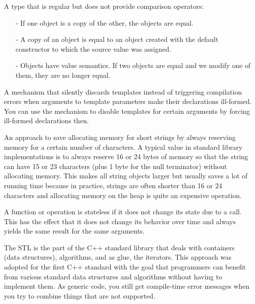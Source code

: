 



A type that is regular but does not provide comparison operators:

\begin{itemize}
\item [-]
If one object is a copy of the other, the objects are equal.

\item [-]
A copy of an object is equal to an object created with the default constructor to which the source value was assigned.

\item [-]
Objects have value semantics. If two objects are equal and we modify one of them, they are no longer equal.
\end{itemize}


A mechanism that silently discards templates instead of triggering compilation errors when arguments to template parameters make their declarations ill-formed. You can use the mechanism to disable templates for certain arguments by forcing ill-formed declarations then.


An approach to save allocating memory for short strings by always reserving memory for a certain number of characters. A typical value in standard library implementations is to always reserve 16 or 24 bytes of memory so that the string can have 15 or 23 characters (plus 1 byte for the null terminator) without allocating memory. This makes all string objects larger but usually saves a lot of running time because in practice, strings are often shorter than 16 or 24 characters and allocating memory on the heap is quite an expensive operation.


A function or operation is stateless if it does not change its state due to a call. This has the effect that it does not change its behavior over time and always yields the same result for the same arguments.


The STL is the part of the C++ standard library that deals with containers (data structures), algorithms, and as glue, the iterators. This approach was adopted for the first C++ standard with the goal that programmers can benefit from various standard data structures and algorithms without having to implement them. As generic code, you still get compile-time error messages when you try to combine things that are not supported.



